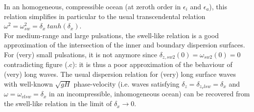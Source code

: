 \documentclass[a4paper,11pt]{article}
\begin{document}
In an homogeneous, compressible ocean (at zeroth order in $\epsilon_i$ and $\epsilon_a$), this relation simplifies in particular to the usual transcendental relation $\omega^2=\omega_{sw}^2 = \delta_x\ tanh(\delta_x)$.\\
For medium-range and large pulsations, the swell-like relation is a good approximation of the intersection of the inner and boundary dispersion surfaces. For (very) small pulsations, it is not anymore since $\delta_{z,sw2}(0)=\omega_{sw2}(0)=0$ contradicting figure (.c): it is thus a poor approximation of the behaviour of (very) long waves.
The usual dispersion relation for (very) long surface waves with well-known $\sqrt{g H}$ phase-velocity (i.e. waves satisfying $\delta_z=\delta_{z_vlsw}=\delta_x$ and $\omega=\omega_{vlsw}=\delta_x$ in an incompressible, inhomogeneous ocean) can be recovered from the swell-like relation in the limit of $\delta_x\longrightarrow 0$. \\

\end{document}
